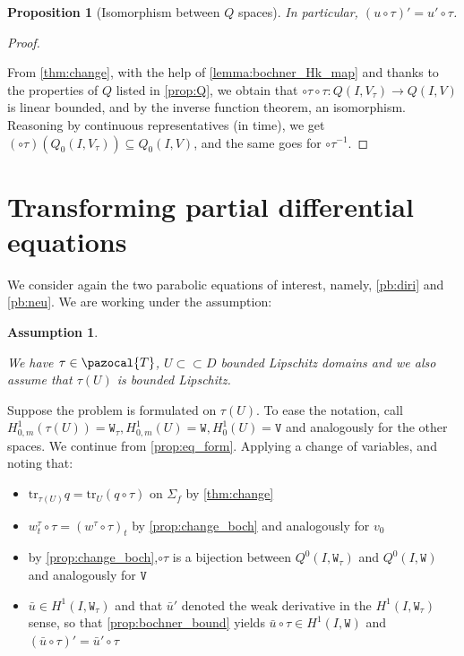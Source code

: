 \documentclass[english,a4paper,9pt,oneside]{scrbook}	%
\theoremstyle{break}
\newtheorem{prop}[equation]{Proposition}
\newtheorem{ass}[equation]{Assumption}
\newenvironment{mproof}[1][\proofname]{%
  \begin{proof}[#1]$ $\par\nobreak\ignorespaces
}{%
  \end{proof}
}
\renewcommand*{\proofname}{Proof}
\theoremstyle{remark}
\newcommand{\tr}{\text{tr}}
\newcommand{\cc}{\subset\subset}
\newcommand{\cT}{\pazocal{T}}
\newcommand{\tw}[1]{\texttt{#1}}
\begin{document}
\begin{appendices}
\begin{prop}[Isomorphism between $Q$ spaces]
In particular, $(u\circ \tau)' = u'\circ \tau$.

\end{prop}

\begin{mproof}
From \cref{thm:change}, with the help of \cref{lemma:bochner_Hk_map} and thanks to the properties of $Q$ listed in \cref{prop:Q}, we obtain that $\circ \tau \circ \tau : Q(I,V_\tau)\rightarrow Q(I,V)$ is linear bounded, and by the inverse function theorem, an isomorphism. Reasoning by continuous representatives (in time), we get $(\circ \tau)(Q_0(I,V_\tau))\subseteq Q_0(I,V)$, and the same goes for $\circ \tau^{-1}$.
\end{mproof}


\section{Transforming partial differential equations}

We consider again the two parabolic equations of interest, namely, \cref{pb:diri} and \cref{pb:neu}. We are working under the assumption:

\begin{ass}
\label{ass:pull}

We have $\tau \in \cT$, $U\cc D$ bounded Lipschitz domains and we also assume that $\tau(U)$ is bounded Lipschitz.
\end{ass}

Suppose the problem is formulated on $\tau(U)$. To ease the notation, call $H^1_{0,m}(\tau(U))=\tw{W}_\tau, H^1_{0,m}(U)=\tw{W}, H^1_0(U)=\tw{V}$ and analogously for the other spaces.
We continue from \cref{prop:eq_form}. Applying a change of variables, and noting that:

\begin{itemize}
	\item $\tr_{\tau(U)} q = \tr_U(q\circ \tau)$ on $\Sigma_f$ by \cref{thm:change}
	\item $w_t^\tau\circ \tau = (w^\tau\circ \tau)_t$ by \cref{prop:change_boch} and analogously for $v_0$
	\item by \cref{prop:change_boch},$\circ \tau$ is a bijection between $Q^0(I,\tw{W}_\tau)$ and $Q^0(I,\tw{W})$ and analogously for $\tw{V}$
	\item $\bar{u} \in H^1(I,\tw{W}_\tau)$ and that $\bar{u}'$ denoted the weak derivative in the $H^1(I,\tw{W}_\tau)$ sense, so that \cref{prop:bochner_bound} yields $\bar{u}\circ \tau \in H^1(I,\tw{W})$ and $(\bar{u}\circ \tau )' = \bar{u}'\circ \tau $
\end{itemize}


\end{appendices}
\end{document}
